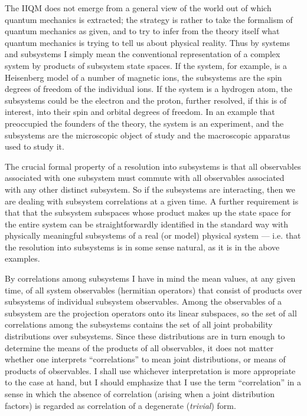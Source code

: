 The IIQM does not emerge from a general view of the world out of which
quantum mechanics is extracted; the strategy is rather to take the
formalism of quantum mechanics as given, and to try to infer from the
theory itself what quantum mechanics is trying to tell us about
physical reality.  Thus by systems and subsystems I simply mean the
conventional representation of a complex system by products of
subsystem state spaces. If the system, for example, is a Heisenberg
model of a number of magnetic ions, the subsystems are the spin
degrees of freedom of the individual ions.  If the system is a
hydrogen atom, the subsystems could be the electron and the proton,
further resolved, if this is of interest, into their spin and orbital
degrees of freedom.  In an example that preoccupied the founders of
the theory, the system is an experiment, and the subsystems are the
microscopic object of study and the macroscopic apparatus used to
study it.

The crucial formal property of a resolution into subsystems is that
all observables associated with one subsystem must commute with all
observables associated with any other distinct subsystem.  So if the
subsystems are interacting, then we are dealing with subsystem
correlations at a given time.  A further requirement is that that the
subsystem subspaces whose product makes up the state space for the
entire system can be straightforwardly identified in the standard way
with physically meaningful subsystems of a real (or model) physical
system --- i.e.  that the resolution into subsystems is in some sense
natural, as it is in the above examples.\fn

By correlations among subsystems I have in mind the mean values, at any
given time, of all system observables (hermitian operators) that
consist of products over subsystems of individual subsystem
observables.  Among the observables of a subsystem are the projection
operators onto its linear subspaces, so the set of all correlations
among the subsystems contains the set of all joint probability
distributions over subsystems. Since these distributions are in turn
enough to determine the means of the products of all observables, it
does not matter whether one interprets ``correlations'' to mean joint
distributions, or means of products of observables.  I shall use
whichever interpretation is more appropriate to the case at hand, but
I should emphasize that I use the term ``correlation'' in a sense in
which the absence of correlation (arising when a joint distribution
factors) is regarded as correlation of a degenerate ({\it trivial\/})
form.

